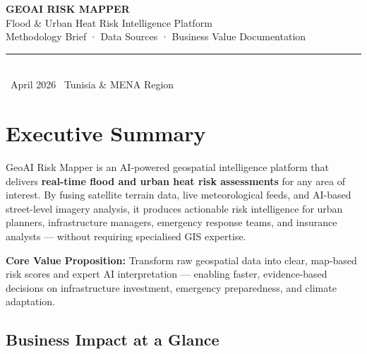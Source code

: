 \documentclass[11pt, a4paper]{article}
\begin{document}
\begin{tcolorbox}[
  enhanced, arc=8pt,
  colback=primary, colframe=accent,
  boxrule=1.5pt,
  left=16pt, right=16pt, top=14pt, bottom=14pt
]
  \begin{center}
    {\color{accent}\large\bfseries\MakeUppercase{GeoAI Risk Mapper}}\\[4pt]
    {\color{white}\normalsize Flood \& Urban Heat Risk Intelligence Platform}\\[8pt]
    {\color{white!60}\small Methodology Brief · Data Sources · Business Value Documentation}\\[6pt]
    \textcolor{accent!60}{\rule{0.5\linewidth}{0.5pt}}\\[6pt]
    {\color{white!50}\small\faCalendar\ April 2026 \quad\faMapMarker\ Tunisia \& MENA Region}
  \end{center}
\end{tcolorbox}

\vspace{14pt}

\section{Executive Summary}

GeoAI Risk Mapper is an AI-powered geospatial intelligence platform that delivers
\textbf{real-time flood and urban heat risk assessments} for any area of interest.
By fusing satellite terrain data, live meteorological feeds, and AI-based street-level
imagery analysis, it produces actionable risk intelligence for urban planners,
infrastructure managers, emergency response teams, and insurance analysts — without
requiring specialised GIS expertise.

\begin{infobox}
  \textbf{Core Value Proposition:} Transform raw geospatial data into clear, map-based
  risk scores and expert AI interpretation — enabling faster, evidence-based decisions
  on infrastructure investment, emergency preparedness, and climate adaptation.
\end{infobox}

\subsection*{Business Impact at a Glance}
\end{document}
